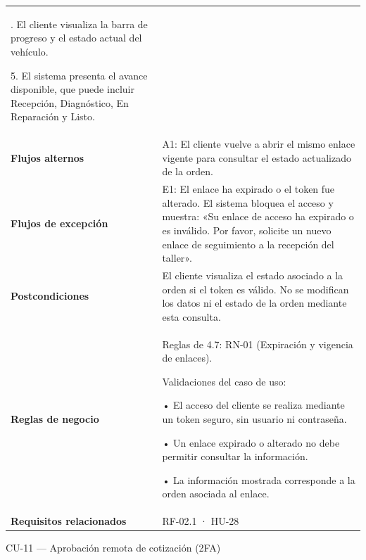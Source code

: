 {\begin{longtable}[]{@{}
  >{\raggedright\arraybackslash}p{}
  >{\raggedright\arraybackslash}p{}@{}}
4. El cliente visualiza la barra de progreso y el estado actual del
vehículo.

5. El sistema presenta el avance disponible, que puede incluir
Recepción, Diagnóstico, En Reparación y Listo. \\
\textbf{Flujos alternos} & A1: El cliente vuelve a abrir el mismo enlace
vigente para consultar el estado actualizado de la orden. \\
\textbf{Flujos de excepción} & E1: El enlace ha expirado o el token fue
alterado. El sistema bloquea el acceso y muestra: «Su enlace de acceso
ha expirado o es inválido. Por favor, solicite un nuevo enlace de
seguimiento a la recepción del taller». \\
\textbf{Postcondiciones} & El cliente visualiza el estado asociado a la
orden si el token es válido. No se modifican los datos ni el estado de
la orden mediante esta consulta. \\
\textbf{Reglas de negocio} & Reglas de 4.7: RN-01 (Expiración y vigencia
de enlaces).

Validaciones del caso de uso:

• El acceso del cliente se realiza mediante un token seguro, sin usuario
ni contraseña.

• Un enlace expirado o alterado no debe permitir consultar la
información.

• La información mostrada corresponde a la orden asociada al enlace. \\
\textbf{Requisitos relacionados} & RF-02.1 · HU-28 \\
\end{longtable}
}

CU-11 --- Aprobación remota de cotización (2FA)

